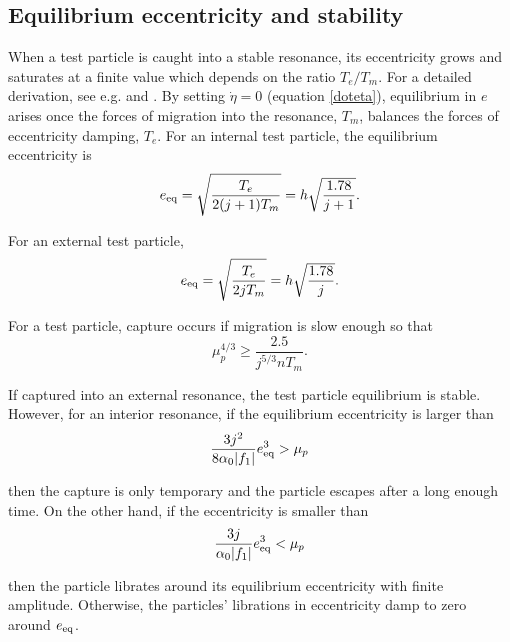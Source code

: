 \documentclass[usenatbib,twocolumn]{mnras}
\DeclarePairedDelimiter{\abs}{|}{|}
\begin{document}
\subsection{Equilibrium eccentricity and stability}
\label{sec:orgb58981e}
When a test particle is caught into a stable resonance, its
eccentricity grows and saturates at a finite value which depends on
the ratio \(T_{e}/T_{m}\).  For a detailed derivation, see e.g.
\citep{goldreich_overstable_2014} and \citep{xu_migration_2018}.
By setting \(\dot\eta=0\) (equation \ref{doteta}), equilibrium
in \(e\) arises once the forces of migration into the resonance, \(T_m\), balances
the forces of eccentricity damping, \(T_e\). For an internal
test particle, the equilibrium eccentricity is
\begin{equation}
\label{eq:eeqint}
  e_{\rm eq} = \sqrt{\frac{T_e}{2(j+1)T_m}} = h\sqrt{\frac{1.78}{j+1}}.
\end{equation}

\noindent
For an external test particle,
\begin{equation}
\label{eq:eeqext}
  e_{\rm eq} = \sqrt{\frac{T_e}{2jT_m}} = h\sqrt{\frac{1.78}{j}}.
\end{equation}

For a test particle, capture occurs if migration is slow enough so that
\citep{goldreich_overstable_2014}
\begin{equation}
\mu_p^{4/3} \geq \frac{2.5}{j^{5/3}n T_m}.
\end{equation}

\noindent
If captured into an external resonance, the test particle equilibrium
is stable. However, for an interior resonance, if the equilibrium
eccentricity is larger than
\begin{equation}
  \frac{3j^2}{8\alpha_0 \abs{f_1}}e_{\rm eq}^3 > \mu_p
\end{equation}

\noindent
then the capture is only temporary and the particle escapes after a
long enough time. On the other hand, if the eccentricity is smaller
than
\begin{equation}
  \frac{3j}{\alpha_0 \abs{f_1}}e_{\rm eq}^3 < \mu_p
\end{equation}

\noindent
then the particle librates around its equilibrium eccentricity with
finite amplitude. Otherwise, the particles' librations in eccentricity
damp to zero around \(e_{\rm eq}\).

\end{document}
